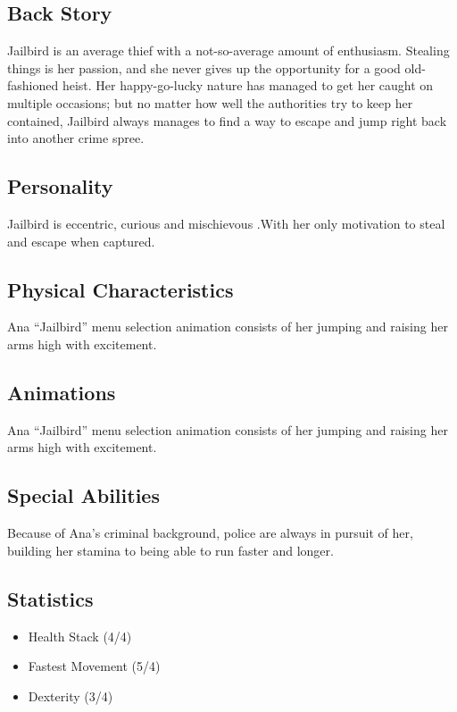 \documentclass[14pt]{report}
\begin{document}
\subsection{Back Story}

Jailbird is an average thief with a not-so-average amount of enthusiasm. Stealing things is her passion, and she never gives up the opportunity for a good old-fashioned heist. Her happy-go-lucky nature has managed to get her caught on multiple occasions; but no matter how well the authorities try to keep her contained, Jailbird always manages to find a way to escape and jump right back into another crime spree.

\subsection{Personality}

Jailbird is eccentric, curious and mischievous .With her only motivation to steal and escape when captured.

\subsection{Physical Characteristics}

Ana “Jailbird” menu selection animation consists of her jumping and raising her arms high with excitement.

\subsection{Animations}

Ana “Jailbird” menu selection animation consists of her jumping and raising her arms high with excitement.

\subsection{Special Abilities}

Because of Ana’s criminal background, police are always in pursuit of her, building her stamina to being able to run faster and longer.

\subsection{Statistics}

\begin{itemize}
    \item Health Stack (4/4)
    \item Fastest Movement (5/4)
    \item Dexterity (3/4)
\end{itemize}
\end{document}
